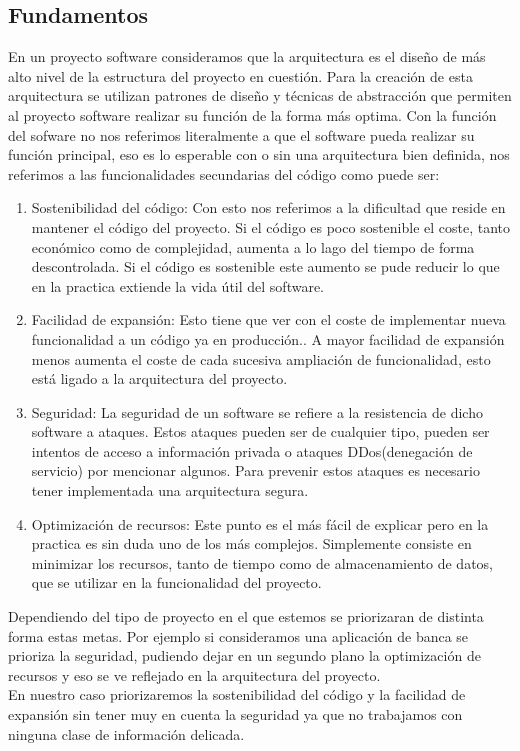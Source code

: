 \documentclass[12pt,a4paper]{article}
\begin{document}
	\subsection{Fundamentos}
En un proyecto software consideramos que la arquitectura es el diseño de más alto nivel de la estructura del proyecto en cuestión. Para la creación de esta arquitectura se utilizan patrones de diseño y técnicas de abstracción que permiten al proyecto software realizar su función de la forma más optima. Con la función del sofware no nos referimos literalmente a que el software pueda realizar su función principal, eso es lo esperable con o sin una arquitectura bien definida, nos referimos a las funcionalidades secundarias del código como puede ser:
\begin{enumerate}
\item Sostenibilidad del código: Con esto nos referimos a la dificultad que reside en mantener el código del proyecto. Si el código es poco sostenible el coste, tanto económico como de complejidad, aumenta a lo lago del tiempo de forma descontrolada. Si el código es sostenible este aumento se pude reducir lo que en la practica extiende la vida útil del software.\\
\item Facilidad de expansión: Esto tiene que ver con el coste de implementar nueva funcionalidad a un código ya en producción.. A mayor facilidad de expansión menos aumenta el coste de cada sucesiva ampliación de funcionalidad, esto está ligado a la arquitectura del proyecto.
\item Seguridad: La seguridad de un software se refiere a la resistencia de dicho software a ataques. Estos ataques pueden ser de cualquier tipo, pueden ser intentos de acceso a información privada o ataques DDos(denegación de servicio) por mencionar algunos. Para prevenir estos ataques es necesario tener implementada una arquitectura segura.
\item Optimización de recursos: Este punto es el más fácil de explicar pero en la practica es sin duda uno de los más complejos. Simplemente consiste en minimizar los recursos, tanto de tiempo como de almacenamiento de datos, que se utilizar en la funcionalidad del proyecto.
\end{enumerate}
Dependiendo del tipo de proyecto en el que estemos se priorizaran de distinta forma estas metas. Por ejemplo si consideramos una aplicación de banca se prioriza la seguridad, pudiendo dejar en un segundo plano la optimización de recursos y eso se ve reflejado en la arquitectura del proyecto.\\
En nuestro caso priorizaremos la sostenibilidad del código y la facilidad de expansión sin tener muy en cuenta la seguridad ya que no trabajamos con ninguna clase de información delicada.\\
\end{document}
